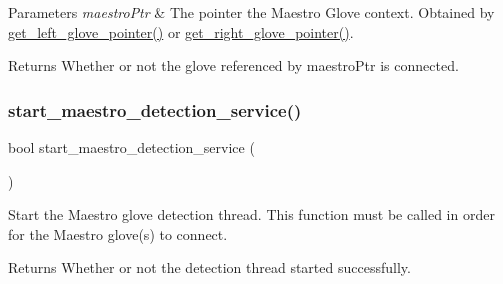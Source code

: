 \begin{DoxyParams}{Parameters}
{\em maestro\+Ptr} & The pointer the Maestro Glove context. Obtained by \hyperlink{group__glove_context_access_ga63ce3c99d4a8b8db851b22af9185764e}{get\+\_\+left\+\_\+glove\+\_\+pointer()} or \hyperlink{group__glove_context_access_ga9b8fd9d91aeac3f8da50f7a7eba0c32b}{get\+\_\+right\+\_\+glove\+\_\+pointer()}. \\
\hline
\end{DoxyParams}
\begin{DoxyReturn}{Returns}
Whether or not the glove referenced by {\ttfamily maestro\+Ptr} is connected. 
\end{DoxyReturn}
\mbox{\label{group__glove_context_access_ga10088517f643220611dfcd5da08bfaa1}} 
\subsubsection{\texorpdfstring{start\+\_\+maestro\+\_\+detection\+\_\+service()}{start\_maestro\_detection\_service()}}
{\footnotesize\ttfamily bool start\+\_\+maestro\+\_\+detection\+\_\+service (\begin{DoxyParamCaption}{ }\end{DoxyParamCaption})}

Start the Maestro glove detection thread. This function must be called in order for the Maestro glove(s) to connect. \begin{DoxyReturn}{Returns}
Whether or not the detection thread started successfully. 
\end{DoxyReturn}
